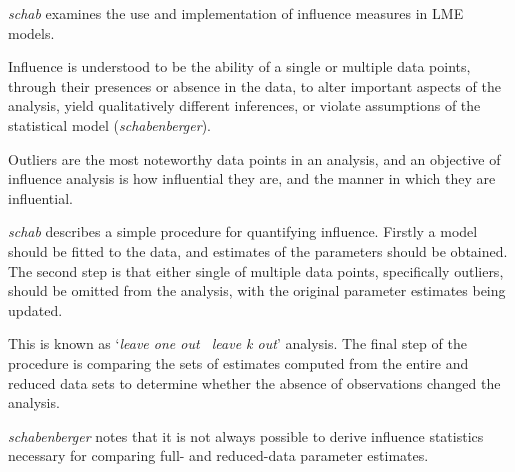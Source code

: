 \documentclass[12pt, a4paper]{report}
\theoremstyle{plain}
\theoremstyle{definition}
\theoremstyle{remark}
\begin{document}
\emph{schab} examines the use and implementation of influence measures in LME models.

Influence is understood to be the ability of a single or multiple
data points, through their presences or absence in the data, to
alter important aspects of the analysis, yield qualitatively
different inferences, or violate assumptions of the statistical
model (\textit{schabenberger}).

Outliers are the most noteworthy data points in an analysis, and
an objective of influence analysis is how influential they are,
and the manner in which they are influential.

\emph{schab} describes a simple procedure for quantifying
influence. Firstly a model should be fitted to the data, and
estimates of the parameters should be obtained. The second step is
that either single of multiple data points, specifically outliers,
should be omitted from the analysis, with the original parameter
estimates being updated. 

This is known as `\textit{leave one out \ leave k
	out}' analysis. The final step of the procedure is comparing the
sets of estimates computed from the entire and reduced data sets
to determine whether the absence of observations changed the
analysis.

\textit{schabenberger} notes that it is not always possible to
derive influence statistics necessary for comparing full- and
reduced-data parameter estimates. 

%
%




\end{document}
